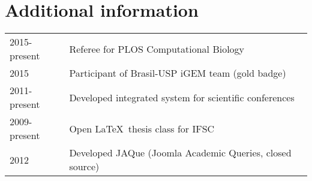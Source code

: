 \documentclass[letterpaper]{resume} %
\begin{document}
\begin{minipage}[t]{0.64\textwidth}
  \sectionspace %


  \section{Additional information}

  \begin{tabular}{ll}
  2015-present & Referee for PLOS Computational Biology \\
  2015 & Participant of Brasil-USP iGEM team (gold badge)\\
  2011-present & Developed integrated system for scientific conferences\\
  2009-present & Open \LaTeX \ thesis class for IFSC\\
  2012 & Developed JAQue (Joomla Academic Queries, closed source)
  \end{tabular}

  \sectionspace %

\end{minipage} %
\end{document}
